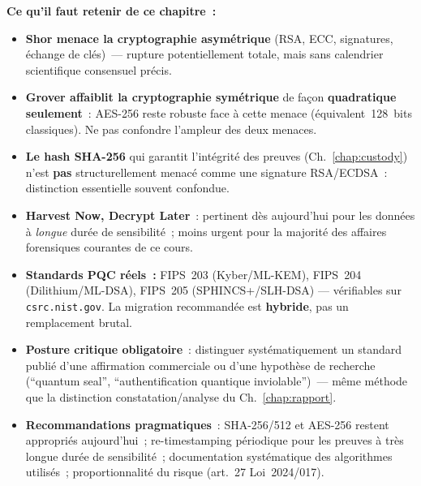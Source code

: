 \separateur

\begin{boxresume}
\textbf{Ce qu'il faut retenir de ce chapitre~:}
\begin{itemize}
    \item \textbf{Shor menace la cryptographie asymétrique}
          (RSA, ECC, signatures, échange de clés)~--- rupture
          potentiellement totale, mais sans calendrier scientifique
          consensuel précis.

    \item \textbf{Grover affaiblit la cryptographie symétrique}
          de façon \textbf{quadratique seulement}~: AES-256 reste
          robuste face à cette menace (équivalent~128~bits classiques).
          Ne pas confondre l'ampleur des deux menaces.

    \item \textbf{Le hash SHA-256} qui garantit l'intégrité des
          preuves (Ch.~\ref{chap:custody}) n'est \textbf{pas}
          structurellement menacé comme une signature RSA/ECDSA~:
          distinction essentielle souvent confondue.

    \item \textbf{Harvest Now, Decrypt Later}~: pertinent dès
          aujourd'hui pour les données à \emph{longue} durée de
          sensibilité~; moins urgent pour la majorité des affaires
          forensiques courantes de ce cours.

    \item \textbf{Standards PQC réels~:} FIPS~203 (Kyber/ML-KEM),
          FIPS~204 (Dilithium/ML-DSA), FIPS~205 (SPHINCS+/SLH-DSA)
          --- vérifiables sur \texttt{csrc.nist.gov}. La migration
          recommandée est \textbf{hybride}, pas un remplacement brutal.

    \item \textbf{Posture critique obligatoire}~: distinguer
          systématiquement un standard publié d'une affirmation
          commerciale ou d'une hypothèse de recherche
          (``quantum seal'', ``authentification quantique
          inviolable'')~--- même méthode que la distinction
          constatation/analyse du Ch.~\ref{chap:rapport}.

    \item \textbf{Recommandations pragmatiques}~: SHA-256/512
          et AES-256 restent appropriés aujourd'hui~; re-timestamping
          périodique pour les preuves à très longue durée de
          sensibilité~; documentation systématique des algorithmes
          utilisés~; proportionnalité du risque (art.~27
          Loi~2024/017).
\end{itemize}
\end{boxresume}

